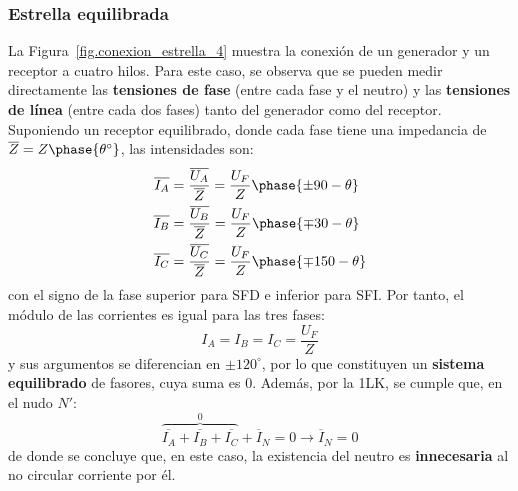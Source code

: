 \documentclass[11pt]{book} %
\begin{document}
	\subsubsection{Estrella equilibrada}
	La Figura~\ref{fig.conexion_estrella_4} muestra la conexión de un generador y un receptor a cuatro hilos. Para este caso, se observa que se pueden medir directamente las \textbf{tensiones de fase} (entre cada fase y el neutro) y las \textbf{tensiones de línea} (entre cada dos fases) tanto del generador como del receptor. Suponiendo un receptor equilibrado, donde cada fase tiene una impedancia de $\overline{Z}=Z\phase{\theta^\circ}$, las intensidades son:
	\begin{align*}
      \overline{I_A} &= \dfrac{\overline{U_A}}{\overline{Z}} = \dfrac{U_F}{Z}\phase{\pm 90 - \theta} \\
      \overline{I_B} &= \frac{\overline{U_B}}{\overline{Z}} = \frac{U_F}{Z}\phase{{\mp 30} - \theta}\\
      \overline{I_C} &= \frac{\overline{U_C}}{\overline{Z}} = \frac{U_F}{Z}\phase{{\mp 150} - \theta}
    \end{align*}
    con el signo de la fase superior para SFD e inferior para SFI. Por tanto, el módulo de las corrientes es igual para las tres fases: 
    \begin{equation}
        \boxed{I_A = I_B = I_C = \dfrac{U_F}{Z}}
    \end{equation}
    y sus argumentos se diferencian en $\pm120^\circ$, por lo que constituyen un \textbf{sistema equilibrado} de fasores, cuya suma es 0. Además, por la 1LK, se cumple que, en el nudo $N'$: 
    \begin{equation}
        \overbrace{\overline{I_A}  + \overline{I_B} + \overline{I_C}}^0 + \overline{I}_N = 0\rightarrow \boxed{\overline{I}_N = 0}
    \end{equation}
    de donde se concluye que, en este caso, la existencia del neutro es \textbf{innecesaria} al no circular corriente por él. 
\end{document}

